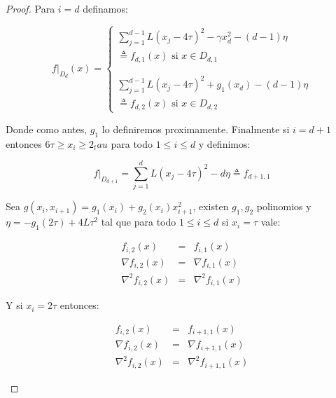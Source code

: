 \begin{proof}
	Para $i=d$ definamos:
	
	\begin{equation}
	f\vert_{D_d}(x) = \left\lbrace \begin{array}{l}
	\sum\limits_{j=1}^{d-1}{L \left(x_j - 4\tau\right)^2}  - \gamma x_d^2 - \left(d-1\right)\eta  \\ \triangleq f_{d,1}(x)  \text{ si } x\in D_{d,1} \\ \\ \\
	\sum\limits_{j=1}^{d-1}{L \left(x_j - 4\tau\right)^2}  + g_1(x_d)  - \left(d-1\right)\eta \\ \triangleq f_{d,2}(x)  \text{ si } x\in D_{d,2}
	\end{array}\right.
	\end{equation}
	
	Donde como antes, $g_1$ lo definiremos proximamente. Finalmente si $i = d+1$ entonces $6\tau \geq x_i \geq 2_tau$ para todo $1 \leq i \leq d$ y definimos:
	
	\begin{equation}
		f\vert_{D_{d+1}} = 	\sum\limits_{j=1}^{d}{L \left(x_j - 4\tau\right)^2}  - d\eta \triangleq f_{d+1,1}
	\end{equation}
	
	\begin{lemma}
		\label{lemma: GD toma tiempo exponencial}
		Sea $g(x_i,x_{i+1}) = g_1(x_i) + g_2(x_i)x_{i+1}^2$, existen $g_1,g_2$ polinomios y $\eta = - g_1(2\tau) + 4L\tau^2$ tal que para todo $1 \leq i \leq d$ si $x_i = \tau$ vale:
		
		\begin{equation*}
			\begin{aligned}
				f_{i,2}(x) &  = & f_{i,1}(x) \\
				\nabla f_{i,2}(x) &  = & \nabla f_{i,1}(x) \\
				\nabla ^2 f_{i,2}(x) &  = & \nabla ^2f_{i,1}(x)
			\end{aligned}
		\end{equation*}
		
		Y si $x_i = 2\tau$ entonces:
		
		\begin{equation*}
		\begin{aligned}
		f_{i,2}(x) &  = & f_{i+1,1}(x) \\
		\nabla f_{i,2}(x) &  = & \nabla f_{i+1,1}(x) \\
		\nabla ^2 f_{i,2}(x) &  = & \nabla ^2f_{i+1,1}(x)
		\end{aligned}
		\end{equation*}
		

\end{lemma}
\end{proof}
